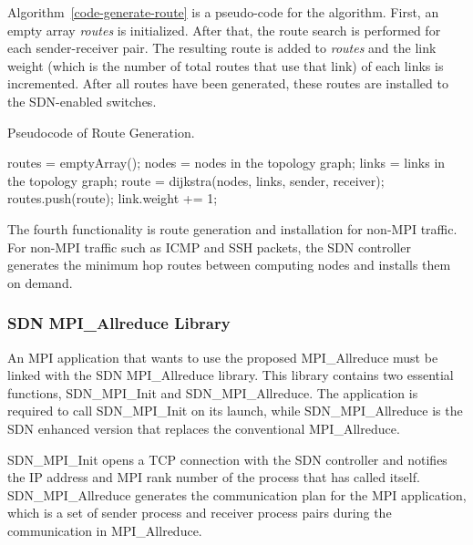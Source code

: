Algorithm~\ref{code-generate-route} is a pseudo-code for the algorithm.
First, an empty array \emph{routes} is initialized. After that, the
route search is performed for each sender-receiver pair. The resulting
route is added to \emph{routes} and the link weight (which is the number
of total routes that use that link) of each links is incremented. After
all routes have been generated, these routes are installed to the
SDN-enabled switches.

\begin{algorithm}
    \caption{Pseudocode of Route Generation.}%
    \label{code-generate-route}
    \begin{algorithmic}
        \STATE routes = emptyArray();
        \STATE nodes = nodes in the topology graph;
        \STATE links = links in the topology graph;
            \STATE route = dijkstra(nodes, links, sender, receiver);
            \STATE routes.push(route);
                \STATE link.weight += 1;
            \ENDFOR
        \ENDFOR
    \end{algorithmic}
\end{algorithm}

The fourth functionality is route generation and installation for
non-MPI traffic. For non-MPI traffic such as ICMP and SSH packets, the
SDN controller generates the minimum hop routes between computing nodes
and installs them on demand.

\subsubsection{SDN MPI\_Allreduce Library}

An MPI application that wants to use the proposed MPI\_Allreduce must be
linked with the SDN MPI\_Allreduce library. This library contains two
essential functions, SDN\_MPI\_Init and SDN\_MPI\_Allreduce. The application
is required to call SDN\_MPI\_Init on its launch, while SDN\_MPI\_Allreduce is
the SDN enhanced version that replaces the conventional MPI\_Allreduce.

SDN\_MPI\_Init opens a TCP connection with the SDN controller and notifies the
IP address and MPI rank number of the process that has called itself.
SDN\_MPI\_Allreduce generates the communication plan for the MPI application,
which is a set of sender process and receiver process pairs during the
communication in MPI\_Allreduce.

